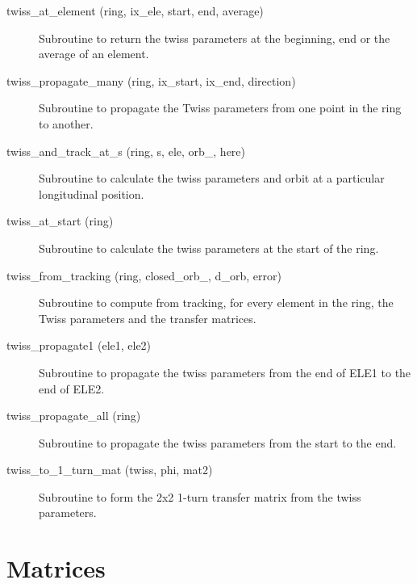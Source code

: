 \begin{description}
\item[twiss\_at\_element (ring, ix\_ele, start, end, average)] \Newline
Subroutine to return the twiss parameters at the beginning, end or the average of an element. 

\item[twiss\_propagate\_many (ring, ix\_start, ix\_end, direction)] \Newline
Subroutine to propagate the Twiss parameters from one point in the ring to another. 

\item[twiss\_and\_track\_at\_s (ring, s, ele, orb\_, here)] \Newline
Subroutine to calculate the twiss parameters and orbit at a particular longitudinal position. 

\item[twiss\_at\_start (ring)] \Newline
Subroutine to calculate the twiss parameters at the start of the ring. 

\item[twiss\_from\_tracking (ring, closed\_orb\_, d\_orb, error)] \Newline
Subroutine to compute from tracking, for every element in the ring, 
the Twiss parameters and the transfer matrices. 

\item[twiss\_propagate1 (ele1, ele2)] \Newline
Subroutine to propagate the twiss parameters from the end of ELE1 to the end of ELE2. 

\item[twiss\_propagate\_all (ring)] \Newline
Subroutine to propagate the twiss parameters from the start to the end. 

\item[twiss\_to\_1\_turn\_mat (twiss, phi, mat2)] \Newline
Subroutine to form the 2x2 1-turn transfer matrix from the twiss parameters. 

\end{description}

\section{Matrices}
\label{r:mat}

